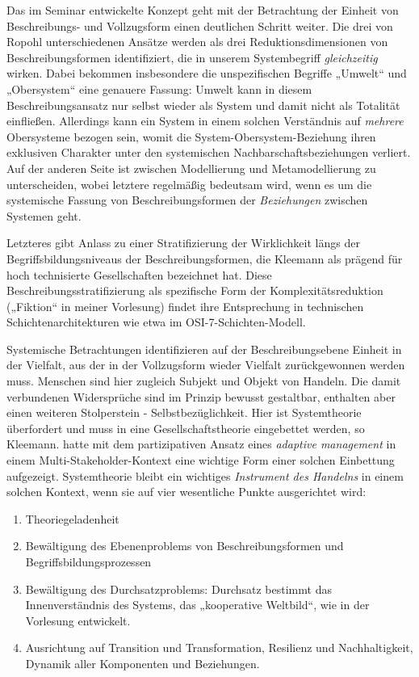 \documentclass[11pt,a4paper]{article}
\begin{document}
Das im Seminar entwickelte Konzept geht mit der Betrachtung der Einheit von
Beschreibungs- und Vollzugsform einen deutlichen Schritt weiter. Die drei von
Ropohl unterschiedenen An\-sätze werden als drei Reduktionsdimensionen von
Beschreibungsformen identifiziert, die in unserem Systembegriff
\emph{gleichzeitig} wirken. Dabei bekommen insbesondere die unspezifischen
Begriffe „Umwelt“ und „Obersystem“ eine genauere Fassung: Umwelt kann in
diesem Beschreibungsansatz nur selbst wieder als System und damit nicht als
Totalität einfließen.  Allerdings kann ein System in einem solchen Verständnis
auf \emph{mehrere} Obersysteme bezogen sein, womit die
System-Obersystem-Beziehung ihren exklusiven Charakter unter den systemischen
Nachbarschaftsbeziehungen verliert. Auf der anderen Seite ist zwischen
Modellierung und Metamodellierung zu unterscheiden, wobei letztere regelmäßig
bedeutsam wird, wenn es um die systemische Fassung von Beschreibungsformen der
\emph{Beziehungen} zwischen Systemen geht.

Letzteres gibt Anlass zu einer Stratifizierung der Wirklichkeit längs der
Begriffsbildungsniveaus der Beschreibungsformen, die Kleemann als prägend für
hoch technisierte Gesellschaften bezeichnet hat. Diese
Beschreibungsstratifizierung als spezifische Form der Komplexitätsreduktion
(„Fiktion“ in meiner Vorlesung) findet ihre Entsprechung in technischen
Schichtenarchitekturen wie etwa im OSI-7-Schichten-Modell.

Systemische Betrachtungen identifizieren auf der Beschreibungsebene Einheit in
der Vielfalt, aus der in der Vollzugsform wieder Vielfalt zurückgewonnen
werden muss. Menschen sind hier zugleich Subjekt und Objekt von Handeln. Die
damit verbundenen Widersprüche sind im Prinzip bewusst gestaltbar, enthalten
aber einen weiteren Stolperstein - Selbstbezüglichkeit. Hier ist Systemtheorie
überfordert und muss in eine Gesellschaftstheorie eingebettet werden, so
Kleemann.  \cite{Foxon2009} hatte mit dem partizipativen Ansatz eines
\emph{adaptive management} in einem Multi-Stakeholder-Kontext eine wichtige
Form einer solchen Einbettung aufgezeigt. Systemtheorie bleibt ein wichtiges
\emph{Instrument des Handelns} in einem solchen Kontext, wenn sie auf vier
wesentliche Punkte ausgerichtet wird:
\begin{enumerate}[noitemsep]
\item Theoriegeladenheit
\item Bewältigung des Ebenenproblems von Beschreibungsformen und
  Begriffsbildungsprozessen
\item Bewältigung des Durchsatzproblems: Durchsatz bestimmt das
  Innenverständnis des Systems, das „kooperative Weltbild“, wie in der
  Vorlesung entwickelt.
\item Ausrichtung auf Transition und Transformation, Resilienz und
  Nachhaltigkeit, Dynamik aller Komponenten und Beziehungen.
\end{enumerate}
\end{document}
